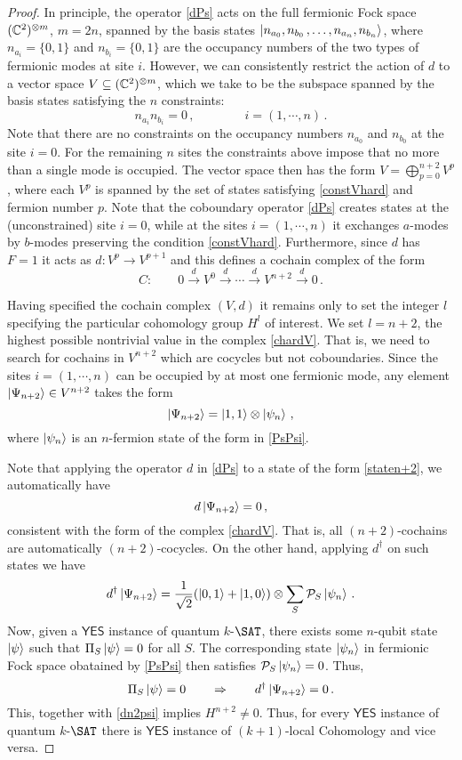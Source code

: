 \documentclass[11pt]{article}
\numberwithin{equation}{section}
\def\cP{{\cal P}}
\newcommand{\yes}{\mathsf{YES}}
\newcommand\equ[1] {\begin{equation}#1\end{equation}}
\renewcommand\( {\left(}
\renewcommand\) {\right)}
\begin{document}
\begin{proof}
 In principle, the operator \eqref{dPs} acts on the full fermionic Fock space $(\Bbb C^2)^{\otimes m}$, $m=2n$, spanned by the basis states $\ket{n_{a_{0}},n_{b_{0}}\,,\dots, n_{a_{n}},n_{b_{n}}}$, where $n_{a_{i}}=\{0,1\}$ and $n_{b_{i}}=\{0,1\}$ are the occupancy numbers of the two types of fermionic modes at site $i$. However, we can consistently restrict the action of $d$ to a vector space $V\subseteq (\Bbb C^2)^{\otimes m}$, which we take  to be the subspace spanned by the basis states satisfying the $n$ constraints:
\equ{\label{constVhard}
n_{a_{i}}n_{b_{i}}=0\,,\qquad \qquad  i=(1,\cdots,n)\,.
}
Note that there are no constraints on the occupancy numbers $n_{a_{0}}$ and $n_{b_{0}}$ at the site $i=0$. For the remaining $n$ sites the constraints above impose that no more than a single mode is occupied.
The vector space then has the form $V=\bigoplus_{p=0}^{n+2} V^p$, where each $V^{p}$ is spanned by the set of states satisfying \eqref{constVhard} and  fermion number $p$. Note that the coboundary operator \eqref{dPs} creates states at the (unconstrained) site $i=0$, while at the sites $i=(1,\cdots, n)$ it exchanges $a$-modes by $b$-modes preserving the condition \eqref{constVhard}. 
Furthermore, since $d$ has $F=1$ it acts as $d: V^{p}\to V^{p+1}$ and this defines a cochain complex of the form
\equ{\label{chardV}
C:\qquad 0\xrightarrow{d} V^{0}\xrightarrow{d} \cdots \xrightarrow{d} V^{n+2}\xrightarrow{d} 0\,.
}

Having specified the cochain complex $(V,d)$ it remains only to set the integer $l$ specifying the particular cohomology group $H^{l}$ of interest. We set $l=n+2$, the highest possible nontrivial value in the complex \eqref{chardV}. That is, we need to search for cochains in $V^{n+2}$ which are cocycles but not coboundaries. Since the sites $i=(1,\cdots, n)$ can be occupied by at most one fermionic mode, any element  $\ket{\Psi_{n+2}}\in V^{n+2}$ takes the form
\equ{\label{staten+2}
\ket{\Psi_{n+2}}=\ket{1,1}\otimes \ket{\psi_{n}}\,,
}
where $\ket{\psi_{n}}$ is an $n$-fermion state of the form in  \eqref{PsPsi}. 

Note that applying the operator $d$ in  \eqref{dPs} to  a  state of the form  \eqref{staten+2}, we automatically have
\equ{\label{dn2psi}
d\ket{\Psi_{n+2}}=0\,,
}
consistent with the form of the complex \eqref{chardV}.
That is,  all $(n+2)$-cochains are automatically $(n+2)$-cocycles. 
On the other hand, applying $d^\dagger$ on such states we have
\equ{
d^{\dagger}\ket{\Psi_{n+2}}=\frac{1}{\sqrt 2}(\ket{0,1}+\ket{1,0})\otimes \sum_{S}\cP_{S}\ket{\psi_{n}}\,.
}
Now, given a $\yes$ instance of {\sc  quantum $k$-$\SAT$}, there exists some $n$-qubit state  $\ket{\psi}$ such that $\Pi_S \ket{\psi}=0$ for all $S$. The corresponding state $\ket{\psi_n}$ in fermionic Fock space obatained by \eqref{PsPsi} then satisfies $\cP_S \ket{\psi_n}=0$. Thus, 
\equ{
 \Pi_{S}\ket{\psi}=0  \qquad \Rightarrow \qquad d^{\dagger}\ket{\Psi_{n+2}}=0\,.
}
This, together with \eqref{dn2psi} implies $H^{n+2}\neq 0$. Thus, for every $\yes$ instance of {\sc  quantum $k$-$\SAT$} there is $\yes$ instance  of {\sc $(k+1)$-local Cohomology}  and vice versa.




\end{proof}
\end{document}
